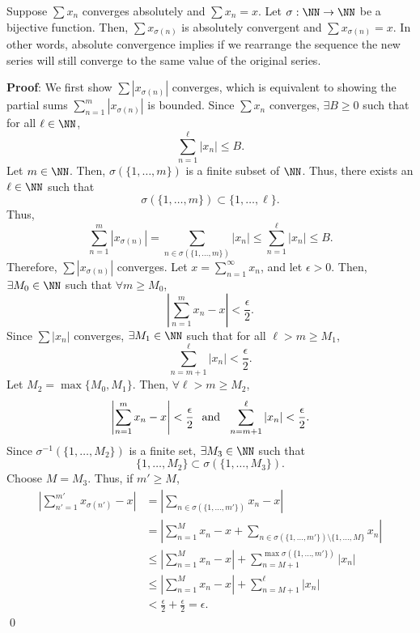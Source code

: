 \begin{theorem}
Suppose $\sum x_n$ converges absolutely and $\sum x_n = x$. Let $\sigma: \NN \to \NN$ be a bijective function. Then, $\sum x_{\sigma(n)}$ is absolutely convergent and $\sum x_{\sigma(n)} = x$. In other words, absolute convergence implies if we rearrange the sequence the new  series will still converge to the same value of the original series.
\end{theorem}
\textbf{Proof}: We first show $\sum |x_{\sigma(n)}|$ converges, which is equivalent to showing the partial sums $\sum_{n=1}^m |x_{\sigma(n)}|$ is bounded. Since $\sum x_n$ converges, $\exists B\geq 0$ such that for all $\ell \in \NN$, 
\[
\sum_{n=1}^\ell |x_n| \leq B.
\]
Let $m\in \NN$. Then, $\sigma(\{1,\dots, m\})$ is a finite subset of $\NN$. Thus, there exists an $\ell \in \NN$ such that 
\[
\sigma(\{1,\dots, m\}) \subset \{1,\dots, \ell\}.
\]
Thus, 
\[
    \sum_{n=1}^m |x_{\sigma(n)}| = \sum_{n\in \sigma(\{1,\dots, m\})} |x_n| \leq \sum_{n=1}^\ell |x_n| \leq B.
\]
Therefore, $\sum |x_{\sigma(n)}|$ converges. Let $x = \sum_{n=1}^\infty x_n$, and let $\epsilon>0$. Then, $\exists M_0 \in \NN$ such that $\forall m\geq M_0$, 
\[
\left|\sum_{n=1}^m x_n - x\right| < \frac{\epsilon}{2}.
\]
Since $\sum |x_n|$ converges, $\exists M_1\in \NN$ such that for all $\ell>m\geq M_1$, 
\[
\sum_{n=m+1}^\ell |x_n| < \frac{\epsilon}{2}.
\]
Let $M_2 = \max \{M_0, M_1\}$. Then, $\forall \ell > m \geq M_2$, 
\[
\left|\sum_{n=1}^m x_n-x\right| < \frac{\epsilon}{2} \hspace{.25cm} \text{and} \hspace{.25cm} \sum_{n=m+1}^\ell |x_n| < \frac{\epsilon}{2}.
\]
Since $\sigma^{-1}(\{1,\dots, M_2\})$ is a finite set, $\exists M_3 \in \NN$ such that 
\[
\{1,\dots, M_2\}\subset \sigma(\{1,\dots, M_3\}).
\]
Choose $M = M_3$. Thus, if $m'\geq M$, 
\begin{align*}
    \left|\sum_{n'=1}^{m'} x_{\sigma(n')}-x\right| &= \left|\sum_{n\in \sigma(\{1,\dots, m'\})} x_n - x\right| \\
    &= \left|\sum_{n=1}^M x_n - x + \sum_{n\in \sigma(\{1,\dots, m'\})\setminus \{1,\dots, M\}} x_n\right| \\
    &\leq \left|\sum_{n=1}^M x_n - x\right| + \sum_{n=M+1}^{\max \sigma(\{1,\dots, m'\})} |x_n| \\
    &\leq \left|\sum_{n=1}^M x_n - x\right| + \sum_{n=M+1}^{\ell} |x_n| \\
    &< \frac{\epsilon}{2} + \frac{\epsilon}{2} = \epsilon.
\end{align*}\qed 

